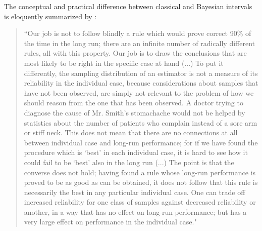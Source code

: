 The conceptual and practical difference between classical and Bayesian intervals is eloquently summarized by :
\begin{quotation}
``Our job is not to follow blindly a rule which would prove correct 90\% of the time in the long run; there are an infinite number of radically different rules, all with this property. Our job is to draw the conclusions that are most likely to be right in the specific case at hand (...) To put it differently, the sampling distribution of an estimator is not a measure of its reliability in the individual case, because considerations about samples that have not been observed, are simply not relevant to the problem of how we should reason from the one that has been observed. A doctor trying to diagnose the cause of Mr. Smith's stomachache would not be helped by statistics about the number of patients who complain instead of a sore arm or stiff neck. This does not mean that there are no connections at all between individual case and long-run performance; for if we have found the procedure which is `best' in each individual case, it is hard to see how it could fail to be `best' also in the long run (...) The point is that the converse does not hold; having found a rule whose long-run performance is proved to be as good as can be obtained, it does not follow that this rule is necessarily the best in any particular individual case. One can trade off increased reliability for one class of samples against decreased reliability or another, in a way that has no effect on long-run performance; but has a very large effect on performance in the individual case."
\end{quotation}

